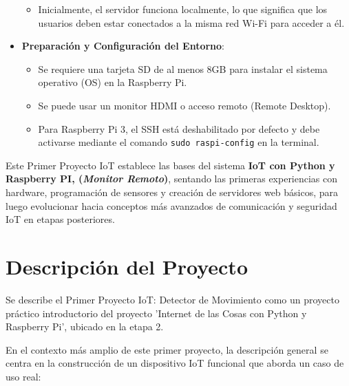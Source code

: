 \documentclass{report}
\begin{document}
\begin{itemize}
\begin{itemize}
        \item Inicialmente, el servidor funciona localmente, lo que significa que los usuarios deben estar conectados a la misma red 
        Wi-Fi para acceder a él.
    \end{itemize}
    \item \textbf{Preparación y Configuración del Entorno}:
    \begin{itemize}
        \item Se requiere una tarjeta SD de al menos 8GB para instalar el sistema operativo (OS) en la Raspberry Pi.
        \item Se puede usar un monitor HDMI o acceso remoto (Remote Desktop).
        \item Para Raspberry Pi 3, el SSH está deshabilitado por defecto y debe activarse mediante el comando \verb|sudo raspi-config| 
        en la terminal.
    \end{itemize}
\end{itemize}
Este Primer Proyecto IoT establece las bases del sistema \textbf{IoT con Python y Raspberry PI, (\textit{Monitor Remoto})}, sentando 
las primeras experiencias con hardware, programación de sensores y creación de servidores web básicos, para luego evolucionar hacia 
conceptos más avanzados de comunicación y seguridad IoT en etapas posteriores.

\section{Descripción del Proyecto}
Se describe el Primer Proyecto IoT: Detector de Movimiento como un proyecto práctico introductorio del proyecto 'Internet de las Cosas con Python y 
Raspberry Pi', ubicado en la etapa 2.

En el contexto más amplio de este primer proyecto, la descripción general se centra en la construcción de un dispositivo IoT funcional que aborda un 
caso de uso real:
\end{document}
